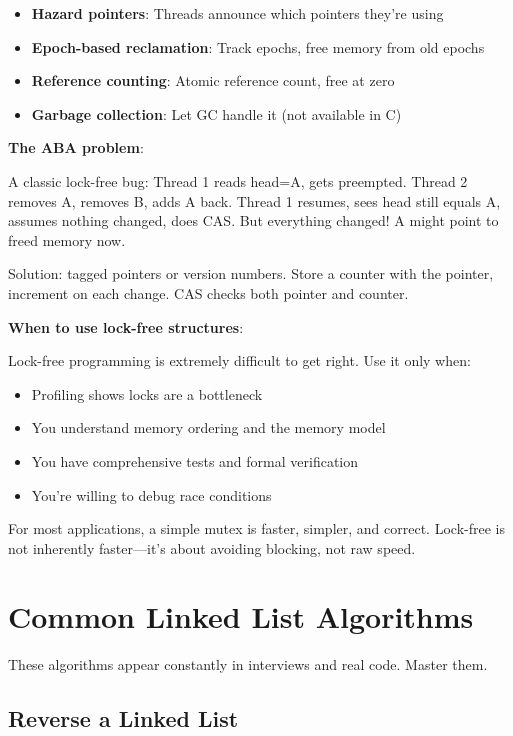 \begin{itemize}
    \item \textbf{Hazard pointers}: Threads announce which pointers they're using
    \item \textbf{Epoch-based reclamation}: Track epochs, free memory from old epochs
    \item \textbf{Reference counting}: Atomic reference count, free at zero
    \item \textbf{Garbage collection}: Let GC handle it (not available in C)
\end{itemize}

\textbf{The ABA problem}:

A classic lock-free bug: Thread 1 reads head=A, gets preempted. Thread 2 removes A, removes B, adds A back. Thread 1 resumes, sees head still equals A, assumes nothing changed, does CAS. But everything changed! A might point to freed memory now.

Solution: tagged pointers or version numbers. Store a counter with the pointer, increment on each change. CAS checks both pointer and counter.

\textbf{When to use lock-free structures}:

Lock-free programming is extremely difficult to get right. Use it only when:
\begin{itemize}
    \item Profiling shows locks are a bottleneck
    \item You understand memory ordering and the memory model
    \item You have comprehensive tests and formal verification
    \item You're willing to debug race conditions
\end{itemize}

For most applications, a simple mutex is faster, simpler, and correct. Lock-free is not inherently faster—it's about avoiding blocking, not raw speed.

\section{Common Linked List Algorithms}

These algorithms appear constantly in interviews and real code. Master them.

\subsection{Reverse a Linked List}

